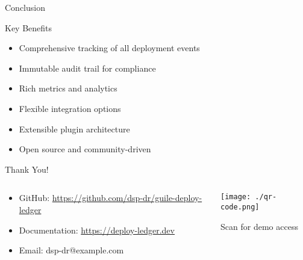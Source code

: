 \documentclass[presentation,aspectratio=169]{beamer}
\begin{document}
\begin{frame}[label={sec:org363fe9a}]{Conclusion}
\begin{block}{Key Benefits}
\begin{itemize}[<+->]
\item \alert{Comprehensive} tracking of all deployment events
\item \alert{Immutable} audit trail for compliance
\item \alert{Rich} metrics and analytics
\item \alert{Flexible} integration options
\item \alert{Extensible} plugin architecture
\item \alert{Open source} and community-driven
\end{itemize}
\end{block}
\begin{block}{Thank You!}
\begin{columns}
\begin{column}{0.5\columnwidth}
\begin{itemize}
\item GitHub: \url{https://github.com/dsp-dr/guile-deploy-ledger}
\item Documentation: \url{https://deploy-ledger.dev}
\item Email: dsp-dr@example.com
\end{itemize}
\end{column}
\begin{column}{0.5\columnwidth}
\begin{center}
\begin{center}
\texttt{[image: ./qr-code.png]}
\end{center}

Scan for demo access
\end{center}
\end{column}
\end{columns}
\end{block}
\end{frame}
\end{document}
